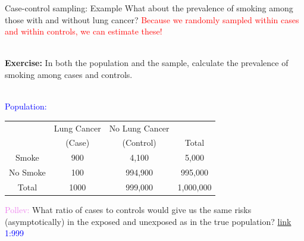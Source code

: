 \documentclass[10pt,t]{beamer}
\begin{document}
\begin{frame}{Case-control sampling: Example}
	\small
	\vspace{-0.7cm}
	What about the prevalence of smoking among those with and without lung cancer? \textcolor{red}{Because we randomly sampled within cases and within controls, we can estimate these!}
	\\ ~\
	
	\textbf{Exercise:} In both the population and the sample, calculate the prevalence of smoking among cases and controls.
	\\ ~\
	
	\textcolor{blue}{Population:} 
	\begin{center}
		\begin{table}
			\begin{tabular}{|c|cc|c|}
				\hline 
				& Lung Cancer & No Lung Cancer &  \\ 
				& (Case) & (Control) & Total  \\
				\hline 
				Smoke & 900 & 4,100  & 5,000 \\ 
				No Smoke & 100 & 994,900 & 995,000  \\ 
				\hline 
				Total & 1000 & 999,000 & 1,000,000 \\ 
				\hline 
			\end{tabular}
		\end{table}
	\end{center}

\textcolor{violet}{Pollev:} What ratio of cases to controls would give us the same risks (asymptotically) in the exposed and unexposed as in the true population? \textcolor{purple}{\href{https://PollEv.com/multiple_choice_polls/AS3rMDos8Yz37Ba4eIv73/respond}{link}} \textcolor{blue}{1:999}

\end{frame}
\end{document}
